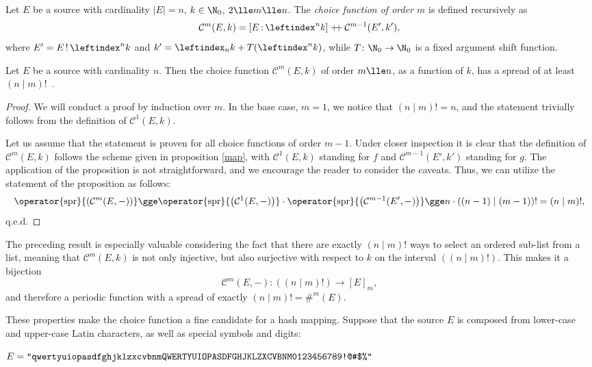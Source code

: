 \documentclass[12pt, a4paper]{article}
\renewcommand{\C}{\mathcal{C}}
\newcommand{\dop}{\mathbin{{+}\hspace{-1mm}{+}}}
\newcommand{\spr}[1]{\operator{\mathrm{spr}}{\left(#1\right)}}
\newcommand{\lli}[1]{\leftindex_{#1}}
\newcommand{\lui}[1]{\leftindex^{#1}}
\newcommand{\elt}{\mathop{:}}
\newcommand{\wo}{\mathop{!}}
\begin{document}
\begin{definition}
    Let $ E $ be a source with cardinality $ |E| = n $, $ k \in \N_0 $, $ 2 \lle m \lle n $. The \emph{choice function of order $ m $} is defined recursively as
    \[ \C^m(E, k) = [E \elt \lui{n}k] \dop \C^{m-1}(E', k'), \]
    where $ E' = E \wo \lui{n}k $ and $ k' = \lli{n}k + T(\lui{n}k) $, while $ T \colon \N_0 \to \N_0 $ is a fixed argument shift function.
\end{definition}

\begin{proposition}
    Let $ E $ be a source with cardinality $ n $. Then the choice function $ \C^m(E, k) $ of order $ m \lle n $, as a function of $ k $, has a spread of at least $ (n \mid m)! $\ .
\end{proposition}
\begin{proof}
    We will conduct a proof by induction over $ m $. In the base case, $ m = 1 $, we notice that $ (n \mid m)! = n $, and the statement trivially follows from the definition of $ \C^1(E, k) $.

    Let us assume that the statement is proven for all choice functions of order $ m - 1 $. Under closer inspection it is clear that the definition of $ \C^m(E, k) $ follows the scheme given in proposition \ref{map}, with $ \C^1(E, k) $ standing for $ f $ and $ \C^{m-1}(E', k') $ standing for $ g $. The application of the proposition is not straightforward, and we encourage the reader to consider the caveats. Thus, we can utilize the statement of the proposition as follows:
    \[ \spr{\C^m(E, -)} \gge \spr{\C^1(E, -)} \cdot \spr{\C^{m-1}(E', -)} \gge n \cdot ((n-1) \mid (m-1))! = (n \mid m)!, \]
    q.e.d.
\end{proof}

The preceding result is especially valuable considering the fact that there are exactly $ (n \mid m)! $ ways to select an ordered sub-list from a list, meaning that $ \C^m(E, k) $ is not only injective, but also surjective with respect to $ k $ on the interval $ ((n \mid m)!) $. This makes it a bijection
\[ \C^m(E, -) \colon ((n \mid m)!) \to [E]_m, \]
and therefore a periodic function with a spread of exactly $ (n \mid m)! = \#^m(E) $.

These properties make the choice function a fine candidate for a hash mapping. Suppose that the source $ E $ is composed from lower-case and upper-case Latin characters, as well as special symbols and digits:

\begin{center}
    $ E = \mbox{\texttt{"qwertyuiopasdfghjklzxcvbnmQWERTYUIOPASDFGHJKLZXCVBNM0123456789!@\#\$\%"}} $
\end{center}
\end{document}
